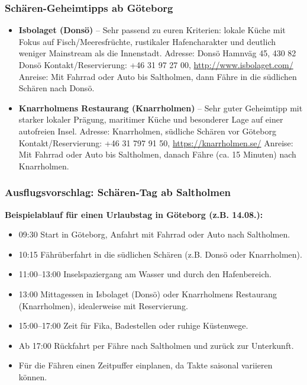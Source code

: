\documentclass[a4paper,12pt]{article}
\begin{document}
\subsubsection{Schären-Geheimtipps ab Göteborg}
\begin{itemize}
\item \textbf{Isbolaget (Donsö)} -- Sehr passend zu euren Kriterien: lokale Küche mit Fokus auf Fisch/Meeresfrüchte, rustikaler Hafencharakter und deutlich weniger Mainstream als die Innenstadt.\newline
Adresse: Donsö Hamnväg 45, 430 82 Donsö\newline
Kontakt/Reservierung: +46 31 97 27 00, \url{http://www.isbolaget.com/}\newline
Anreise: Mit Fahrrad oder Auto bis Saltholmen, dann Fähre in die südlichen Schären nach Donsö.

\item \textbf{Knarrholmens Restaurang (Knarrholmen)} -- Sehr guter Geheimtipp mit starker lokaler Prägung, maritimer Küche und besonderer Lage auf einer autofreien Insel.\newline
Adresse: Knarrholmen, südliche Schären vor Göteborg\newline
Kontakt/Reservierung: +46 31 797 91 50, \url{https://knarrholmen.se/}\newline
Anreise: Mit Fahrrad oder Auto bis Saltholmen, danach Fähre (ca. 15 Minuten) nach Knarrholmen.
\end{itemize}

\subsubsection{Ausflugsvorschlag: Schären-Tag ab Saltholmen}
\textbf{Beispielablauf für einen Urlaubstag in Göteborg (z.B. 14.08.):}
\begin{itemize}
\item 09:30 Start in Göteborg, Anfahrt mit Fahrrad oder Auto nach Saltholmen.
\item 10:15 Fährüberfahrt in die südlichen Schären (z.B. Donsö oder Knarrholmen).
\item 11:00--13:00 Inselspaziergang am Wasser und durch den Hafenbereich.
\item 13:00 Mittagessen in Isbolaget (Donsö) oder Knarrholmens Restaurang (Knarrholmen), idealerweise mit Reservierung.
\item 15:00--17:00 Zeit für Fika, Badestellen oder ruhige Küstenwege.
\item Ab 17:00 Rückfahrt per Fähre nach Saltholmen und zurück zur Unterkunft.
\item Für die Fähren einen Zeitpuffer einplanen, da Takte saisonal variieren können.
\end{itemize}
\end{document}
